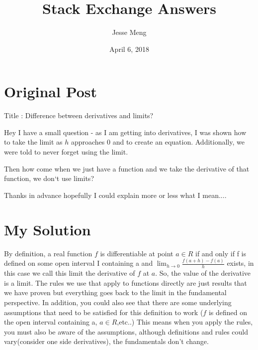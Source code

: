 \documentclass{article}
\title{Stack Exchange Answers}
\author{Jesse Meng }
\date{April 6, 2018}
\begin{document}
\maketitle

\section{Original Post}
Title : Difference between derivatives and limits?

Hey I have a small question - as I am getting into derivatives, I was shown how to take the limit as $h$ approaches $0$ and to create an equation. Additionally, we were told to never forget using the limit.

Then how come when we just have a function and we take the derivative of that function, we don‘t use limits?

Thanks in advance hopefully I could explain more or less what I mean....
\section{My Solution}
By definition, a real function $f$ is differentiable at point $a\in R$ if and only if f is defined on some open interval I containing a and $\lim_{h\to0}\frac{f(a+h)-f(a)}{h}$ exists, in this case we call this limit the derivative of $f$ at $a$. So, the value of the derivative is a limit. The rules we use that apply to functions directly are just results that we have proven but everything goes back to the limit in the fundamental perspective. In addition, you could also see that there are some underlying assumptions that need to be satisfied for this definition to work ($f$ is defined on the open interval containing a, $a\in R$,etc..) This means when you apply the rules, you must also be aware of the assumptions, although definitions and rules could vary(consider one side derivatives), the fundamentals don't change.
\end{document}
